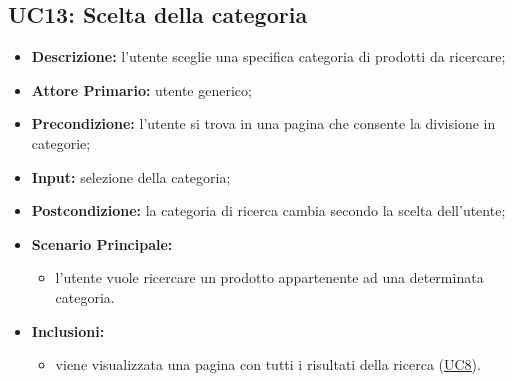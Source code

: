 \subsection{UC13: Scelta della categoria}
\label{sec:UC13}
\begin{itemize}
    \item \textbf{Descrizione:} l'utente sceglie una specifica categoria di prodotti da ricercare;
    \item \textbf{Attore Primario:} utente generico;
    \item \textbf{Precondizione:} l'utente si trova in una pagina che consente la divisione in categorie;
    \item \textbf{Input:} selezione della categoria;
    \item \textbf{Postcondizione:} la categoria di ricerca cambia secondo la scelta dell'utente;
    \item \textbf{Scenario Principale:}
    \begin{itemize}
        \item l'utente vuole ricercare un prodotto appartenente ad una determinata categoria.
    \end{itemize} 
    \item \textbf{Inclusioni:}
    \begin{itemize}
        \item viene visualizzata una pagina con tutti i risultati della ricerca (\hyperref[sec:UC8]{\underline{UC8}}).
    \end{itemize}
\end{itemize}